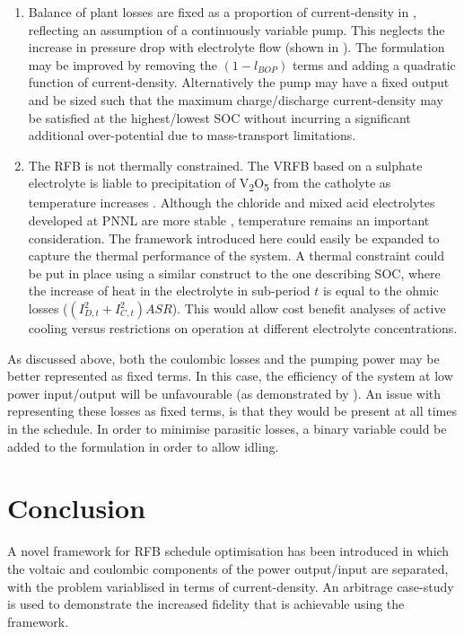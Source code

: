 \documentclass[preprint,3p,review,authoryear,10pt]{elsarticle}
\begin{document}
\begin{enumerate}
    \item Balance of plant losses are fixed as a proportion of current-density in , reflecting an assumption of a continuously variable pump. This neglects the increase in pressure drop with electrolyte flow (shown in \cite{Reed2016}). The formulation may be improved by removing the $(1-l_{BOP})$ terms and adding a quadratic function of current-density. Alternatively the pump may have a  fixed output and be sized such that the maximum charge/discharge current-density may be satisfied at the highest/lowest SOC without incurring a significant additional over-potential due to mass-transport limitations.
    
    \item The RFB is not thermally constrained. The VRFB based on a sulphate electrolyte is liable to precipitation of  V\textsubscript{2}O\textsubscript{5} from the catholyte as temperature increases \citep{Rahman2009,Vijayakumar2011}. Although the chloride and mixed acid electrolytes developed at PNNL are more stable \citep{Li2011,Kim2011}, temperature remains an important consideration. The framework introduced here could easily be expanded to capture the thermal performance of the system. A thermal constraint could be put in place using a similar construct to the one describing SOC, where the increase of heat in the electrolyte in sub-period $t$ is equal to the ohmic losses ($(I_{D,t}^{2} + I_{C,t}^{2})ASR$). This would allow cost benefit analyses of active cooling versus restrictions on operation at different electrolyte concentrations.

    
\end{enumerate}

As discussed above, both the coulombic losses and the pumping power may be better represented as fixed terms. In this case, the efficiency of the system at low power input/output will be unfavourable (as demonstrated by \cite{Nguyen2014}). An issue with representing these losses as fixed terms, is that they would be present at all times in the schedule. In order to minimise parasitic losses, a binary variable could be added to the formulation in order to allow idling.

\section{Conclusion} 
\label{sec:Conclusion}
A novel framework for RFB schedule optimisation has been introduced in which the voltaic and coulombic components of the power output/input are separated, with the problem variablised in terms of current-density. An arbitrage case-study is used to demonstrate the increased fidelity that is achievable using the framework.
\end{document}
